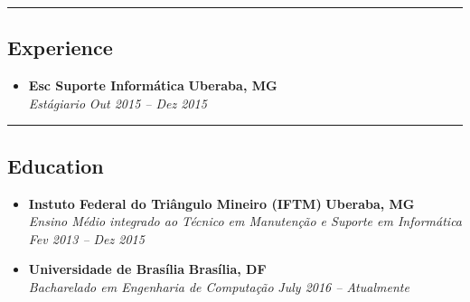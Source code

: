 






\hrule
\vspace{-0.4em}
\subsection*{Experience}

\begin{itemize}
  \parskip=0.1em

  \item
  \headerrow
    {\textbf{Esc Suporte Informática}}
    {\textbf{Uberaba, MG}}
  \\
  \headerrow
    {\emph{Estágiario}}
    {\emph{Out 2015 -- Dez 2015}}


\end{itemize}

\hrule
\vspace{-0.4em}
\subsection*{Education}

\begin{itemize}
  \parskip=0.1em

  \item
  \headerrow
    {\textbf{Instuto Federal do Triângulo Mineiro (IFTM)}}
    {\textbf{Uberaba, MG}}
  \\
  \headerrow
    {\emph{Ensino Médio integrado ao Técnico em Manutenção e Suporte em Informática}}
    {\emph{Fev 2013 -- Dez 2015}}
  \\
  \item
  \headerrow
    {\textbf{Universidade de Brasília}}
    {\textbf{Brasília, DF}}
  \\
  \headerrow
    {\emph{Bacharelado em Engenharia de Computação}}
    {\emph{July 2016 -- Atualmente}}
  \\

\end{itemize}

